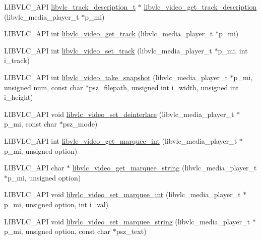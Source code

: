 \begin{DoxyCompactItemize}
L\+I\+B\+V\+L\+C\+\_\+\+A\+PI \hyperlink{structlibvlc__track__description__t}{libvlc\+\_\+track\+\_\+description\+\_\+t} $\ast$ \hyperlink{group__libvlc__video_ga7de5a1b8656341dc9d60fb62c62f802e}{libvlc\+\_\+video\+\_\+get\+\_\+track\+\_\+description} (libvlc\+\_\+media\+\_\+player\+\_\+t $\ast$p\+\_\+mi)
\item 
L\+I\+B\+V\+L\+C\+\_\+\+A\+PI int \hyperlink{group__libvlc__video_ga73827c7709674b557f873b79a6b6b78e}{libvlc\+\_\+video\+\_\+get\+\_\+track} (libvlc\+\_\+media\+\_\+player\+\_\+t $\ast$p\+\_\+mi)
\item 
L\+I\+B\+V\+L\+C\+\_\+\+A\+PI int \hyperlink{group__libvlc__video_ga8b8ee7e31c56b08b31958e92d3f41520}{libvlc\+\_\+video\+\_\+set\+\_\+track} (libvlc\+\_\+media\+\_\+player\+\_\+t $\ast$p\+\_\+mi, int i\+\_\+track)
\item 
L\+I\+B\+V\+L\+C\+\_\+\+A\+PI int \hyperlink{group__libvlc__video_ga9b0a3870ce962aa0358050b2d5a59143}{libvlc\+\_\+video\+\_\+take\+\_\+snapshot} (libvlc\+\_\+media\+\_\+player\+\_\+t $\ast$p\+\_\+mi, unsigned num, const char $\ast$psz\+\_\+filepath, unsigned int i\+\_\+width, unsigned int i\+\_\+height)
\item 
L\+I\+B\+V\+L\+C\+\_\+\+A\+PI void \hyperlink{group__libvlc__video_ga9c1d0af7a58651fdf8803934e35f8c17}{libvlc\+\_\+video\+\_\+set\+\_\+deinterlace} (libvlc\+\_\+media\+\_\+player\+\_\+t $\ast$p\+\_\+mi, const char $\ast$psz\+\_\+mode)
\item 
L\+I\+B\+V\+L\+C\+\_\+\+A\+PI int \hyperlink{group__libvlc__video_gad4b75c4cdc2de2d7316201d6c4f4a1c5}{libvlc\+\_\+video\+\_\+get\+\_\+marquee\+\_\+int} (libvlc\+\_\+media\+\_\+player\+\_\+t $\ast$p\+\_\+mi, unsigned option)
\item 
L\+I\+B\+V\+L\+C\+\_\+\+A\+PI char $\ast$ \hyperlink{group__libvlc__video_ga77bc2682e4cd9771a24948f913ea9379}{libvlc\+\_\+video\+\_\+get\+\_\+marquee\+\_\+string} (libvlc\+\_\+media\+\_\+player\+\_\+t $\ast$p\+\_\+mi, unsigned option)
\item 
L\+I\+B\+V\+L\+C\+\_\+\+A\+PI void \hyperlink{group__libvlc__video_ga0fa929ebe1b9a7ccff9b5f83849e5245}{libvlc\+\_\+video\+\_\+set\+\_\+marquee\+\_\+int} (libvlc\+\_\+media\+\_\+player\+\_\+t $\ast$p\+\_\+mi, unsigned option, int i\+\_\+val)
\item 
L\+I\+B\+V\+L\+C\+\_\+\+A\+PI void \hyperlink{group__libvlc__video_ga53b271a8a125a351142a32447e243a96}{libvlc\+\_\+video\+\_\+set\+\_\+marquee\+\_\+string} (libvlc\+\_\+media\+\_\+player\+\_\+t $\ast$p\+\_\+mi, unsigned option, const char $\ast$psz\+\_\+text)
\item 

\end{DoxyCompactItemize}
